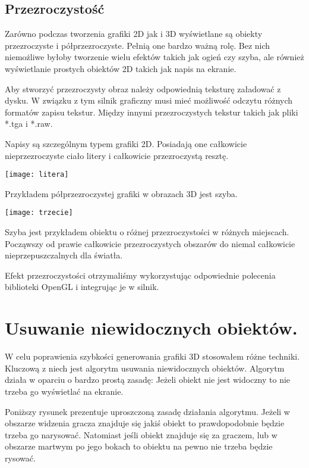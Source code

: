 \documentclass[licencjacka]{pracamgr}
\begin{document}
\subsection{Przezroczystość}

Zarówno podczas tworzenia grafiki 2D jak i 3D wyświetlane są obiekty przezroczyste i półprzezroczyste. Pełnią one bardzo ważną rolę. Bez nich niemożliwe byłoby tworzenie wielu efektów takich jak ogień czy szyba, ale również wyświetlanie prostych obiektów 2D takich jak napis na ekranie.


Aby stworzyć przezroczysty obraz należy odpowiednią teksturę załadować z dysku. W związku z tym silnik graficzny musi mieć możliwość odczytu różnych formatów zapisu tekstur. Między innymi przezroczystych tekstur takich jak pliki *.tga i *.raw.


Napisy są szczególnym typem grafiki 2D. Posiadają one całkowicie nieprzezroczyste ciało litery i całkowicie przezroczystą resztę.

\begin{center}
\texttt{[image: litera]}
\end{center}


Przykładem półprzezroczystej grafiki w obrazach 3D jest szyba.

\begin{center}
\texttt{[image: trzecie]}
\end{center}


Szyba jest przykładem obiektu o różnej przezroczystości w różnych miejscach. Począwszy od prawie całkowicie przezroczystych obszarów do niemal całkowicie nieprzepuszczalnych dla światła.

Efekt przezroczystości otrzymaliśmy wykorzystując odpowiednie polecenia biblioteki OpenGL i integrując je w silnik.

\section{Usuwanie niewidocznych obiektów.}

W celu poprawienia szybkości generowania grafiki 3D stosowałem różne techniki. Kluczową z niech jest algorytm usuwania niewidocznych obiektów. Algorytm działa w oparciu o bardzo prostą zasadę: Jeżeli obiekt nie jest widoczny to nie trzeba go wyświetlać na ekranie.

Poniższy rysunek prezentuje uproszczoną zasadę działania algorytmu. Jeżeli w obszarze widzenia gracza znajduje się jakiś obiekt to prawdopodobnie będzie trzeba go narysować.
Natomiast jeśli obiekt znajduje się za graczem, lub w obszarze martwym po jego bokach to obiektu na pewno nie trzeba będzie rysować.
\end{document}
